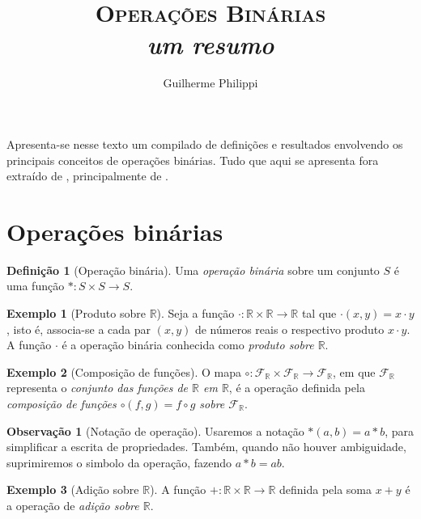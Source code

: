 \documentclass[a4paper,12pt]{article}
\title{\textsc{Operações Binárias}\\ \textsl{um resumo}}
\author{Guilherme Philippi}
\theoremstyle{plain}
\theoremstyle{definition}
\newtheorem{definicao}{Definição}[section]
\newtheorem{observacao}{Observação}[section]
\newtheorem{exemplo}{Exemplo}[section]
\begin{document}
	\maketitle
	
	Apresenta-se nesse texto um compilado de definições e resultados envolvendo os principais conceitos de operações binárias. Tudo que aqui se apresenta fora extraído de \cite{johnAlgebra, michalAlgebra, dominguesAlgebra}, principalmente de \cite{dominguesAlgebra}.

\section{Operações binárias}

\begin{definicao}[Operação binária]
	Uma \emph{operação binária} sobre um conjunto \(S\) é uma função \(*: S\times S \longrightarrow S\).
\end{definicao}

\begin{exemplo}[Produto sobre $\mathbb{R}$]
	Seja a função $\cdot: \mathbb{R}\times\mathbb{R}\longrightarrow\mathbb{R}$ tal que $\cdot(x,y) = x \cdot y$, isto é, associa-se a cada par $(x,y)$ de números reais o respectivo produto $x\cdot y$. A função $\cdot$ é a operação binária conhecida como \emph{produto sobre $\mathbb{R}$}.
\end{exemplo}

\begin{exemplo}[Composição de funções]
	O mapa $\circ:\mathcal{F}_\mathbb{R}\times\mathcal{F}_\mathbb{R}\longrightarrow\mathcal{F}_\mathbb{R}$, em que $\mathcal{F}_\mathbb{R}$ representa o \emph{conjunto das funções de $\mathbb{R}$ em $\mathbb{R}$}, é a operação definida pela \emph{composição de funções $\circ(f,g) = f\circ g$ sobre $\mathcal{F}_\mathbb{R}$}.
\end{exemplo}

\begin{observacao}[Notação de operação]
	Usaremos a notação \(*(a,b) = a*b\), para simplificar a escrita de
	propriedades. Também, quando não houver ambiguidade, suprimiremos o simbolo da operação, fazendo $a*b = ab$.
\end{observacao}

\begin{exemplo}[Adição sobre $\mathbb{R}$]
	A função $+: \mathbb{R}\times\mathbb{R}\longrightarrow\mathbb{R}$ definida pela soma $x+y$ é a operação de \emph{adição sobre $\mathbb{R}$}.
\end{exemplo}
\end{document}
